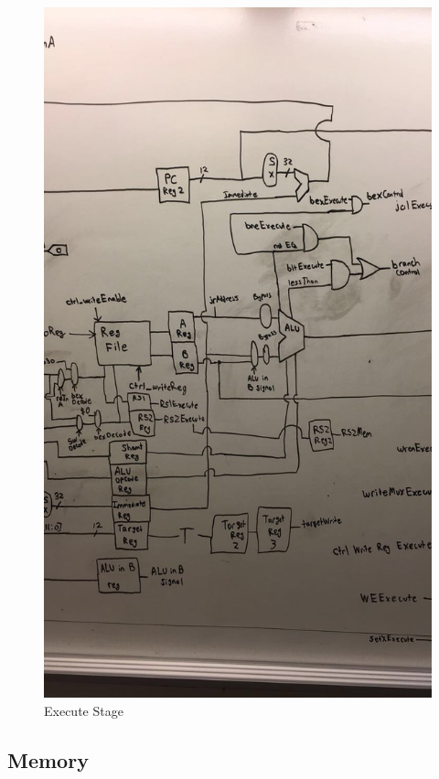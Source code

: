 \documentclass[letterpaper]{article} %
\begin{document}
  \begin{figure}[!htb]
        \includegraphics[scale=.45]{Execute.jpg}
        \caption{Execute Stage}
        \label{fig:2}
    \end{figure}
    
       \FloatBarrier
    
\subsection{Memory}
\end{document}

